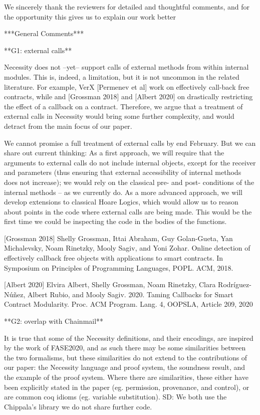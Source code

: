 We sincerely thank the reviewers for detailed and thoughtful comments, and for the opportunity this gives us to explain our work better

***General Comments***

**G1: external calls**

Necessity does not --yet-- support calls of external methods from within internal modules. This is, indeed, a limitation, but it is not uncommon in the related literature. For example, VerX [Permenev et al] work on effectively call-back free contracts, while and [Grossman 2018] and  [Albert 2020] on drastically restricting the effect of a callback on a contract. Therefore, we argue that a treatment of  external calls in Necessity would bring some further complexity, and would  detract from the main focus of our paper.  

We cannot promise a full treatment of external calls by end February. But we can share out current thinking:  As a first approach, we will require that the arguments to external calls do not include internal objects, except for the receiver and parameters (thus ensuring that external accessibility of internal methods does not increase); we would rely on the classical pre- and post- conditions of the internal methods -- as we currently do. As a more advanced approach, we will develop extensions to classical Hoare Logics, which would allow us to reason about points in the code where external calls are being made. This would be the first time we could be inspecting the code in the bodies of the functions.

[Grossman 2018] Shelly Grossman, Ittai Abraham, Guy Golan-Gueta, Yan Michalevsky, Noam Rinetzky, Mooly Sagiv, and Yoni Zohar. Online detection of effectively callback free objects with applications to smart contracts. In Symposium on Principles of Programming Languages, POPL. ACM, 2018.

[Albert 2020] Elvira Albert, Shelly Grossman, Noam Rinetzky, Clara Rodríguez-Núñez, Albert Rubio, and Mooly Sagiv. 2020. Taming Callbacks for Smart Contract Modularity. Proc. ACM Program. Lang. 4, OOPSLA, Article 209, 2020


**G2:  overlap with Chainmail**

 It is true that some of the Necessity definitions, and their encodings, are inspired by the work of FASE2020, 
and as such there may be some similarities between the two formalisms, but these similarities do not extend to the contributions of our paper: the Necessity language and proof system, 
the soundness result, and the example of the proof system. Where there are similarities, these either have been explicitly stated in the paper (eg. permission, provenance, and control),
or are common coq idioms (eg. variable substitution).
SD: We both use the Chippala's library we do not share further code. 


